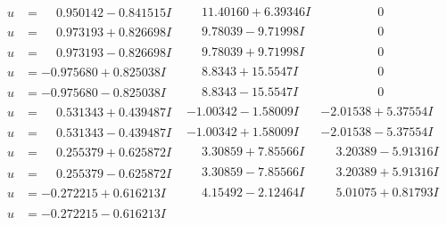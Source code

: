 \documentclass[1p]{elsarticle_modified}
\theoremstyle{definition}
\begin{document}
$$\begin{array}{c|c|c}
\begin{aligned}
u &= \phantom{-}0.950142 - 0.841515 I\end{aligned}
 & \phantom{-}11.40160 + 6.39346 I & \phantom{-0.000000 } 0 \\ \hline\begin{aligned}
u &= \phantom{-}0.973193 + 0.826698 I\end{aligned}
 & \phantom{-}9.78039 - 9.71998 I & \phantom{-0.000000 } 0 \\ \hline\begin{aligned}
u &= \phantom{-}0.973193 - 0.826698 I\end{aligned}
 & \phantom{-}9.78039 + 9.71998 I & \phantom{-0.000000 } 0 \\ \hline\begin{aligned}
u &= -0.975680 + 0.825038 I\end{aligned}
 & \phantom{-}8.8343 + 15.5547 I & \phantom{-0.000000 } 0 \\ \hline\begin{aligned}
u &= -0.975680 - 0.825038 I\end{aligned}
 & \phantom{-}8.8343 - 15.5547 I & \phantom{-0.000000 } 0 \\ \hline\begin{aligned}
u &= \phantom{-}0.531343 + 0.439487 I\end{aligned}
 & -1.00342 - 1.58009 I & -2.01538 + 5.37554 I \\ \hline\begin{aligned}
u &= \phantom{-}0.531343 - 0.439487 I\end{aligned}
 & -1.00342 + 1.58009 I & -2.01538 - 5.37554 I \\ \hline\begin{aligned}
u &= \phantom{-}0.255379 + 0.625872 I\end{aligned}
 & \phantom{-}3.30859 + 7.85566 I & \phantom{-}3.20389 - 5.91316 I \\ \hline\begin{aligned}
u &= \phantom{-}0.255379 - 0.625872 I\end{aligned}
 & \phantom{-}3.30859 - 7.85566 I & \phantom{-}3.20389 + 5.91316 I \\ \hline\begin{aligned}
u &= -0.272215 + 0.616213 I\end{aligned}
 & \phantom{-}4.15492 - 2.12464 I & \phantom{-}5.01075 + 0.81793 I \\ \hline\begin{aligned}
u &= -0.272215 - 0.616213 I\end{aligned}

\end{array}$$
\end{document}
